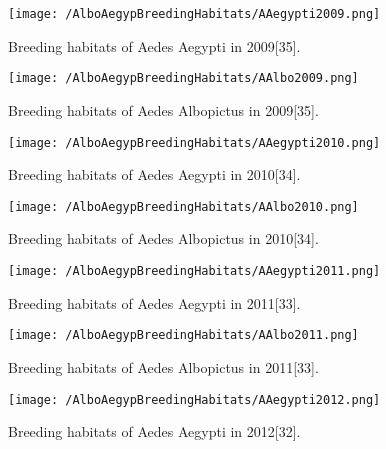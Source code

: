\documentclass[11pt]{exam}
\begin{document}
\begin{questions}
\begin{enumerate}
\newpage
\begin{figure}[H]
  \centering
   \texttt{[image: /AlboAegypBreedingHabitats/AAegypti2009.png]} 
  \caption{Breeding habitats of Aedes Aegypti in 2009[35].}
   \label{Breeding habitats of Aedes mosquitoes}
\end{figure} 

\begin{figure}[H]
  \centering
   \texttt{[image: /AlboAegypBreedingHabitats/AAlbo2009.png]} 
  \caption{Breeding habitats of Aedes Albopictus in 2009[35].}
   \label{Breeding habitats of Aedes mosquitoes}
\end{figure} 

\newpage
\begin{figure}[H]
  \centering
   \texttt{[image: /AlboAegypBreedingHabitats/AAegypti2010.png]} 
  \caption{Breeding habitats of Aedes Aegypti in 2010[34].}
   \label{Breeding habitats of Aedes mosquitoes}
\end{figure} 

\begin{figure}[H]
  \centering
   \texttt{[image: /AlboAegypBreedingHabitats/AAlbo2010.png]} 
  \caption{Breeding habitats of Aedes Albopictus in 2010[34].}
   \label{Breeding habitats of Aedes mosquitoes}
\end{figure} 

\newpage
\begin{figure}[H]
  \centering
   \texttt{[image: /AlboAegypBreedingHabitats/AAegypti2011.png]} 
  \caption{Breeding habitats of Aedes Aegypti in 2011[33].}
   \label{Breeding habitats of Aedes mosquitoes}
\end{figure} 

\begin{figure}[H]
  \centering
   \texttt{[image: /AlboAegypBreedingHabitats/AAlbo2011.png]} 
  \caption{Breeding habitats of Aedes Albopictus in 2011[33].}
   \label{Breeding habitats of Aedes mosquitoes}
\end{figure} 

\newpage
\begin{figure}[H]
  \centering
   \texttt{[image: /AlboAegypBreedingHabitats/AAegypti2012.png]} 
  \caption{Breeding habitats of Aedes Aegypti in 2012[32].}
   \label{Breeding habitats of Aedes mosquitoes}
\end{figure} 


\end{enumerate}
\end{questions}
\end{document}
